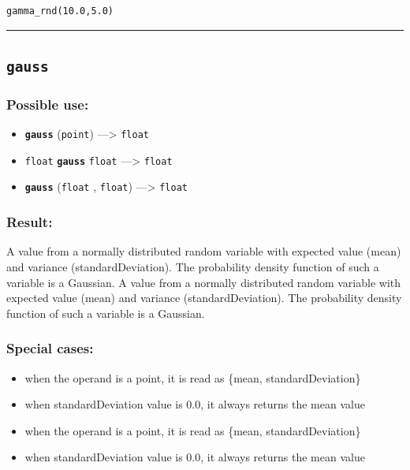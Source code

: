 \documentclass[]{book}
\providecommand{\tightlist}{%
  \setlength{\itemsep}{0pt}\setlength{\parskip}{0pt}}
\theoremstyle{definition}
\theoremstyle{definition}
\theoremstyle{definition}
\theoremstyle{remark}
\begin{document}
\begin{verbatim}
gamma_rnd(10.0,5.0) 
\end{verbatim}

\begin{center}\rule{0.5\linewidth}{\linethickness}\end{center}

\subsection{\texorpdfstring{\texttt{gauss}}{gauss}}\label{gauss}

\subsubsection{Possible use:}\label{possible-use-185}

\begin{itemize}
\tightlist
\item
  \textbf{\texttt{gauss}} (\texttt{point}) ---\textgreater{}
  \texttt{float}
\item
  \texttt{float} \textbf{\texttt{gauss}} \texttt{float}
  ---\textgreater{} \texttt{float}
\item
  \textbf{\texttt{gauss}} (\texttt{float} , \texttt{float})
  ---\textgreater{} \texttt{float}
\end{itemize}

\subsubsection{Result:}\label{result-179}

A value from a normally distributed random variable with expected value
(mean) and variance (standardDeviation). The probability density
function of such a variable is a Gaussian. A value from a normally
distributed random variable with expected value (mean) and variance
(standardDeviation). The probability density function of such a variable
is a Gaussian.

\subsubsection{Special cases:}\label{special-cases-66}

\begin{itemize}
\tightlist
\item
  when the operand is a point, it is read as \{mean,
  standardDeviation\}\\
\item
  when standardDeviation value is 0.0, it always returns the mean
  value\\
\item
  when the operand is a point, it is read as \{mean,
  standardDeviation\}\\
\item
  when standardDeviation value is 0.0, it always returns the mean value
\end{itemize}
\end{document}
